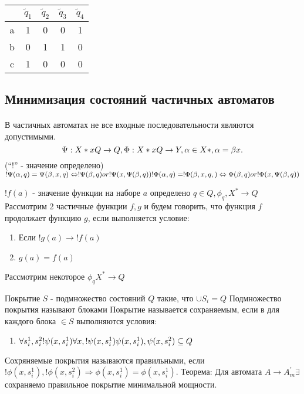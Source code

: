\documentclass[a5paper,10pt]{article}
\begin{document}
				\begin{table}[h]
					\centering
					\begin{tabular}{*{5}{c}}
						& $\tilde q_1$ & $\tilde q_2$ & $\tilde q_3$ & $\tilde q_4$ \\
						\hline
						a & 1 & 0 & 0 & 1 \\
						b & 0 & 1 & 1 & 0 \\
						c & 1 & 0 & 0 & 0 \\
					\end{tabular}
				\end{table}

		\subsection{Минимизация состояний частичных автоматов}
			\paragraph{}
				В частичных автоматах не все входные последовательности являются допустимыми.
				\begin{equation}
					\Psi: X*xQ \to Q, \\
					\Phi: X*xQ \to Y, \\
					\alpha \in X*, \alpha=\beta x. \\
				\end{equation}
				(``!'' - значение определено)
				$!\Psi(\alpha,q)=\Psi(\beta,x,q) \Leftrightarrow !\Psi(\beta,q) or !\Psi(x,\Psi(\beta,q)) \\
				!\Phi(\alpha,q)=!\Phi(\beta,x,q,) \Leftrightarrow \Phi(\beta,q) or !\Phi(x,\Psi(\beta,q))$

				$ !f(a) $ - значение функции на наборе $a$ определено
				$q \in Q, \phi_q, X^{*} \rightarrow Q$
				Рассмотрим 2 частичные функции $f,g$ и будем говорить, что функция $f$ продолжает функцию $g$, если выполняется условие:
				\begin{enumerate}
					\item Если $ !g(a) \rightarrow !f(a) $
					\item $ g(a) = f(a) $
				\end{enumerate}
				Рассмотрим некоторое $ \phi_q X^{*} \rightarrow Q $

				Покрытие $S$ - подмножество состояний $Q$ такие, что $\cup S_i = Q$
				Подмножество покрытия называют блоками 
				Покрытие называется сохраняемым, если в для каждого блока $\in S$ выполняются условия:
				\begin{enumerate}
					\item $ \forall s_i^1, s_i^2 !\psi(x,s_i^1) \forall x, \\
					 !\psi(x,s_i^1) \psi(x,s_i^1),\psi(x,s_i^2) \subseteq Q $
				\end{enumerate}
				Сохряняемые покрытия называются правильными, если $!\phi(x,s_i^1), !\phi(x,s_i^2) \Rightarrow \phi(x,s_i^1)=\phi(x,s_i^1)$.
				Теорема: Для автомата $ A \rightarrow A^\prime_m \exists $ сохраняемо правильное покрытие минимальной мощности.
\end{document}
